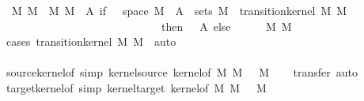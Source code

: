 \begin{isabellebody}
\ \ M\ M{\isacharprime}{\kern0pt}\ {\isasymkappa}{\isachardot}{\kern0pt}\ {\isacharparenleft}{\kern0pt}M{\isacharcomma}{\kern0pt}\ M{\isacharprime}{\kern0pt}{\isacharcomma}{\kern0pt}\ {\isasymlambda}{\isasymomega}\ A{\isacharprime}{\kern0pt}{\isachardot}{\kern0pt}\ if\ {\isasymomega}\ {\isasymin}\ space\ M\ {\isasymand}\ A{\isacharprime}{\kern0pt}\ {\isasymin}\ sets\ M{\isacharprime}{\kern0pt}\ {\isasymand}\ transition{\isacharunderscore}{\kern0pt}kernel\ M\ M{\isacharprime}{\kern0pt}\ {\isasymkappa}\isanewline
\ \ \ \ \ \ \ \ \ \ \ \ \ \ \ \ \ \ \ \ \ \ \ \ \ \ \ \ \ then\ {\isasymkappa}\ {\isasymomega}\ A{\isacharprime}{\kern0pt}\ else\ {}{\isacharparenright}{\kern0pt}{\isachardoublequoteclose}\isanewline
%
\isadelimproof
\ \ %
\endisadelimproof
%
\isatagproof
{}\isamarkupfalse%
\ \ M\ M{\isacharprime}{\kern0pt}\ {\isasymkappa}\isanewline
\ \ \ \ \isamarkupfalse%
\ {\isacharparenleft}{\kern0pt}cases\ {\isachardoublequoteopen}transition{\isacharunderscore}{\kern0pt}kernel\ M\ M{\isacharprime}{\kern0pt}\ {\isasymkappa}{\isachardoublequoteclose}{\isacharparenright}{\kern0pt}\ auto\isanewline
\ \ \isamarkupfalse%
%
\endisatagproof
{\isafoldproof}%
%
\isadelimproof
\isanewline
%
\endisadelimproof
\ \ \ \ \ \ \ \ \ \ \ \ \ \ \ \ \ \ \ \ \ \ \ \ \ \ \ \ \ \ \ \ \ \ \ \ \ \ \ \ \ \ \ \ \ \ \ \ \ \ \ \ \ \ \ \ \ \ \ \ \ \ \ \ \ \isanewline
{}\isamarkupfalse%
\ source{\isacharunderscore}{\kern0pt}kernel{\isacharunderscore}{\kern0pt}of\ {\isacharbrackleft}{\kern0pt}simp{\isacharbrackright}{\kern0pt}{\isacharcolon}{\kern0pt}\ {\isachardoublequoteopen}kernel{\isacharunderscore}{\kern0pt}source\ {\isacharparenleft}{\kern0pt}kernel{\isacharunderscore}{\kern0pt}of\ M\ M{\isacharprime}{\kern0pt}\ {\isasymkappa}{\isacharparenright}{\kern0pt}\ {\isacharequal}{\kern0pt}\ M{\isachardoublequoteclose}\isanewline
%
\isadelimproof
\ \ %
\endisadelimproof
%
\isatagproof
{}\isamarkupfalse%
\ {\isacharparenleft}{\kern0pt}transfer{\isacharcomma}{\kern0pt}\ auto{\isacharparenright}{\kern0pt}%
\endisatagproof
{\isafoldproof}%
%
\isadelimproof
\isanewline
%
\endisadelimproof
\isanewline
{}\isamarkupfalse%
\ target{\isacharunderscore}{\kern0pt}kernel{\isacharunderscore}{\kern0pt}of\ {\isacharbrackleft}{\kern0pt}simp{\isacharbrackright}{\kern0pt}{\isacharcolon}{\kern0pt}\ {\isachardoublequoteopen}kernel{\isacharunderscore}{\kern0pt}target\ {\isacharparenleft}{\kern0pt}kernel{\isacharunderscore}{\kern0pt}of\ M\ M{\isacharprime}{\kern0pt}\ {\isasymkappa}{\isacharparenright}{\kern0pt}\ {\isacharequal}{\kern0pt}\ M{\isacharprime}{\kern0pt}{\isachardoublequoteclose}\isanewline

\end{isabellebody}
